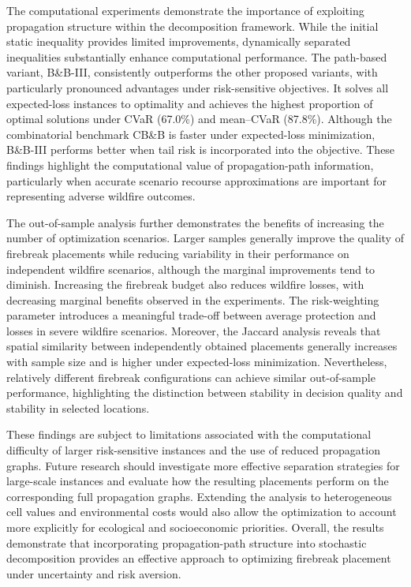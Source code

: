 \documentclass[a4paper,fleqn]{cas-sc}
\begin{document}
The computational experiments demonstrate the importance of exploiting
propagation structure within the decomposition framework. While the
initial static inequality provides limited improvements, dynamically
separated inequalities substantially enhance computational performance.
The path-based variant, B\&B-III, consistently outperforms the other
proposed variants, with particularly pronounced advantages under
risk-sensitive objectives. It solves all expected-loss instances to
optimality and achieves the highest proportion of optimal solutions
under CVaR (67.0\%) and mean--CVaR (87.8\%). Although the combinatorial
benchmark CB\&B is faster under expected-loss minimization, B\&B-III
performs better when tail risk is incorporated into the objective.
These findings highlight the computational value of propagation-path
information, particularly when accurate scenario recourse approximations
are important for representing adverse wildfire outcomes.

The out-of-sample analysis further demonstrates the benefits of
increasing the number of optimization scenarios. Larger samples generally
improve the quality of firebreak placements while reducing variability
in their performance on independent wildfire scenarios, although
the marginal improvements tend to diminish. Increasing the firebreak
budget also reduces wildfire losses, with decreasing marginal benefits
observed in the experiments. The risk-weighting parameter introduces
a meaningful trade-off between average protection and losses in severe
wildfire scenarios. Moreover, the Jaccard analysis reveals that spatial
similarity between independently obtained placements generally increases
with sample size and is higher under expected-loss minimization.
Nevertheless, relatively different firebreak configurations can achieve
similar out-of-sample performance, highlighting the distinction between
stability in decision quality and stability in selected locations.

These findings are subject to limitations associated with the
computational difficulty of larger risk-sensitive instances and the
use of reduced propagation graphs. Future research should investigate
more effective separation strategies for large-scale instances and
evaluate how the resulting placements perform on the corresponding
full propagation graphs. Extending the analysis to heterogeneous
cell values and environmental costs would also allow the optimization
to account more explicitly for ecological and socioeconomic priorities.
Overall, the results demonstrate that incorporating propagation-path
structure into stochastic decomposition provides an effective approach
to optimizing firebreak placement under uncertainty and risk aversion.
\end{document}
